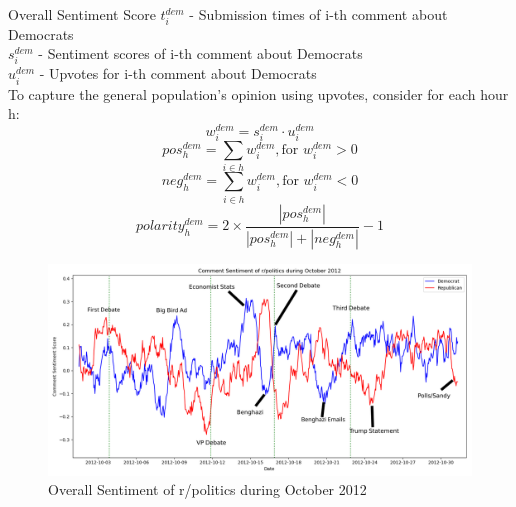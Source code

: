 \documentclass[aspectratio=169,notes]{beamer}
\begin{document}
\begin{frame}{Overall Sentiment Score}
 \(t_i^{dem}\) - Submission times of i-th comment about Democrats\\
 \(s_i^{dem}\) - Sentiment scores of i-th comment about Democrats\\
 \(u_i^{dem}\) - Upvotes for i-th comment about Democrats\\
 \pause
 To capture the general population's opinion using upvotes, consider for each hour h:\\
 \begin{equation}
  w_i^{dem} = s_i^{dem} \cdot  u_i^{dem}
 \end{equation}\pause
 \begin{equation}
  pos_{h}^{dem} = \sum_{i \in h}w_i^{dem}, \text{for } w_i^{dem}>0
 \end{equation}\pause
 \begin{equation}
  neg_{h}^{dem} = \sum_{i \in h}w_i^{dem}, \text{for } w_i^{dem}<0
 \end{equation}\pause
 \begin{equation}
  polarity_h^{dem} = 2\times \frac{\left | pos_h^{dem} \right |}{\left | pos_h^{dem} \right | + \left | neg_h^{dem} \right |}-1
 \end{equation}
\end{frame}

\begin{frame}
 \begin{figure}[htp]
 \centering
 \includegraphics[width=\linewidth]{comment_sentiment_politics.png}
 \caption{Overall Sentiment of r/politics during October 2012}
\end{figure}
\end{frame}
\end{document}
